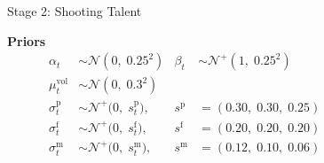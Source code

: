 \documentclass[final]{beamer}
\newlength{\gutterwid}
\newlength{\onecolwid}
\begin{document}
\begin{frame}[t]
\begin{columns}[t,totalwidth=\textwidth]
\begin{column}{\onecolwid}
\begin{block}{Stage 2: Shooting Talent}
\vspace{3ex}

\textbf{Priors}
\vspace{0.5ex}
\[
\begin{aligned}
  \alpha_t &\sim \mathcal{N}(0,\; 0.25^2)
    & \beta_t  &\sim \mathcal{N}^{+}(1,\; 0.25^2) \\[4pt]
  \mu^{\mathrm{vol}}_t &\sim \mathcal{N}(0,\; 0.3^2) \\[4pt]
  \sigma^{\mathrm{p}}_t
    &\sim \mathcal{N}^{+}\!\bigl(0,\; s^{\mathrm{p}}_t\bigr),
    &s^{\mathrm{p}}
    &= (0.30,\; 0.30,\; 0.25) \\
  \sigma^{\mathrm{f}}_t
    &\sim \mathcal{N}^{+}\!\bigl(0,\; s^{\mathrm{f}}_t\bigr),
    &s^{\mathrm{f}}
    &= (0.20,\; 0.20,\; 0.20) \\
  \sigma^{\mathrm{m}}_t
    &\sim \mathcal{N}^{+}\!\bigl(0,\; s^{\mathrm{m}}_t\bigr),
    &s^{\mathrm{m}}
    &= (0.12,\; 0.10,\; 0.06)
\end{aligned}
\]


\end{block}







\end{column}

\begin{column}{\gutterwid}\end{column}



\end{columns}
\end{frame}
\end{document}
